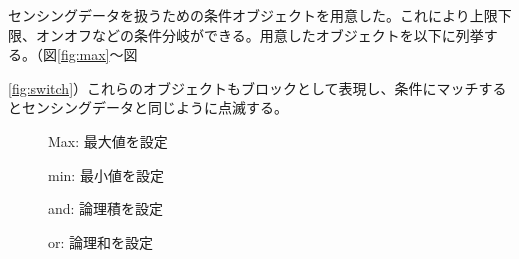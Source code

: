 センシングデータを扱うための条件オブジェクトを用意した。これにより上限下限、オンオフなどの条件分岐ができる。用意したオブジェクトを以下に列挙する。（図{\ref{fig:max}}〜図{\ref{fig:switch}）これらのオブジェクトもブロックとして表現し、条件にマッチするとセンシングデータと同じように点滅する。

\begin{figure}[htbp]
  \begin{minipage}{0.5\hsize}
    \begin{center}
    \end{center}
    \caption{Max: 最大値を設定}
    \label{fig:max}
  \end{minipage}
  \begin{minipage}{0.5\hsize}
    \begin{center}
    \end{center}
    \caption{min: 最小値を設定}
    \label{fig:min}
  \end{minipage}
\end{figure}

\begin{figure}[htbp]
  \begin{minipage}{0.5\hsize}
    \begin{center}
    \end{center}
    \caption{and: 論理積を設定}
    \label{fig:and}
  \end{minipage}
  \begin{minipage}{0.5\hsize}
    \begin{center}
    \end{center}
    \caption{or: 論理和を設定}
    \label{fig:or}
  \end{minipage}
\end{figure}

}
